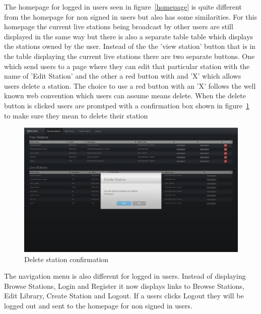 \documentclass[a4paper, 12pt]{report}
\begin{document}
The homepage for logged in users seen in figure~\ref{homepage} is quite different from the homepage for non signed in users but also has some similarities. For this homepage the current live stations being broadcast by other users are still displayed in the same way but there is also a separate table table which displays the stations owned by the user. Instead of the the 'view station' button that is in the table displaying the current live stations there are two separate buttons. One which send users to a page where they can edit that particular station with the name of 'Edit Station' and the other a red button with and 'X' which allows users delete a station. The choice to use a red button with an 'X' follows the well known web convention which users can assume means delete. 
When the delete button is clicked users are promtped with a confirmation box shown in figure~\ref{delete-confirm} to make sure they mean to delete their station  \\
\begin{figure}[H]
  \centering
    \includegraphics[width=1.0\textwidth]{screenshots/delete-station-confirm.png}
    \caption{Delete station confirmation}
    \label{delete-confirm}
\end{figure}
The navigation menu is also different for logged in users. Instead of displaying Browse Stations, Login and Register it now displays links to  Browse Stations, Edit Library, Create Station and Logout. If a users clicks Logout they will be logged out and sent to the homepage for non signed in users.
\end{document}
